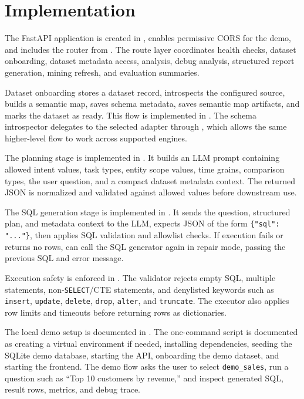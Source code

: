 \documentclass[12pt,a4paper]{article}
\begin{document}
\section{Implementation}

The FastAPI application is created in , enables permissive CORS for the demo, and includes the router from . The route layer coordinates health checks, dataset onboarding, dataset metadata access, analysis, debug analysis, structured report generation, mining refresh, and evaluation summaries.

Dataset onboarding stores a dataset record, introspects the configured source, builds a semantic map, saves schema metadata, saves semantic map artifacts, and marks the dataset as ready. This flow is implemented in . The schema introspector delegates to the selected adapter through , which allows the same higher-level flow to work across supported engines.

The planning stage is implemented in . It builds an LLM prompt containing allowed intent values, task types, entity scope values, time grains, comparison types, the user question, and a compact dataset metadata context. The returned JSON is normalized and validated against allowed values before downstream use.

The SQL generation stage is implemented in . It sends the question, structured plan, and metadata context to the LLM, expects JSON of the form \texttt{\{"sql": "..."\}}, then applies SQL validation and allowlist checks. If execution fails or returns no rows,  can call the SQL generator again in repair mode, passing the previous SQL and error message.

Execution safety is enforced in . The validator rejects empty SQL, multiple statements, non-\texttt{SELECT}/CTE statements, and denylisted keywords such as \texttt{insert}, \texttt{update}, \texttt{delete}, \texttt{drop}, \texttt{alter}, and \texttt{truncate}. The executor also applies row limits and timeouts before returning rows as dictionaries.

The local demo setup is documented in . The one-command script  is documented as creating a virtual environment if needed, installing dependencies, seeding the SQLite demo database, starting the API, onboarding the demo dataset, and starting the frontend. The demo flow asks the user to select \texttt{demo\_sales}, run a question such as ``Top 10 customers by revenue,'' and inspect generated SQL, result rows, metrics, and debug trace.
\end{document}

